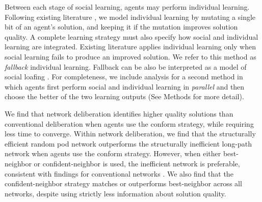 \documentclass[twocolumn,10pt]{article}
\begin{document}
Between each stage of social learning, agents may perform individual learning. Following existing literature \cite{lazer_network_2007, barkoczi_social_2016}, we model individual learning by mutating a single bit of an agent's solution, and keeping it if the mutation improves solution quality.
A complete learning strategy must also specify how social and individual learning are integrated. Existing literature \cite{lazer_network_2007, barkoczi_social_2016} applies individual learning only when social learning fails to produce an improved solution. We refer to this method as {\em fallback} individual learning. Fallback can be also be interpreted as a model of social loafing \cite{karau_social_1993}. For completeness, we include analysis for a second method in which agents first perform social and individual learning in {\em parallel} and then choose the better of the two learning outputs (See Methods for more detail).

We find that network deliberation identifies higher quality solutions than conventional deliberation when agents use the conform strategy, while requiring less time to converge. Within network deliberation, we find that the structurally efficient random pod network outperforms the structurally inefficient long-path network when agents use the conform strategy. However, when either best-neighbor or confident-neighbor is used, the inefficient network is preferable, consistent with findings for conventional networks \cite{barkoczi_social_2016}. We also find that the confident-neighbor strategy matches or outperforms best-neighbor across all networks, despite using strictly less information about solution quality.
\end{document}
